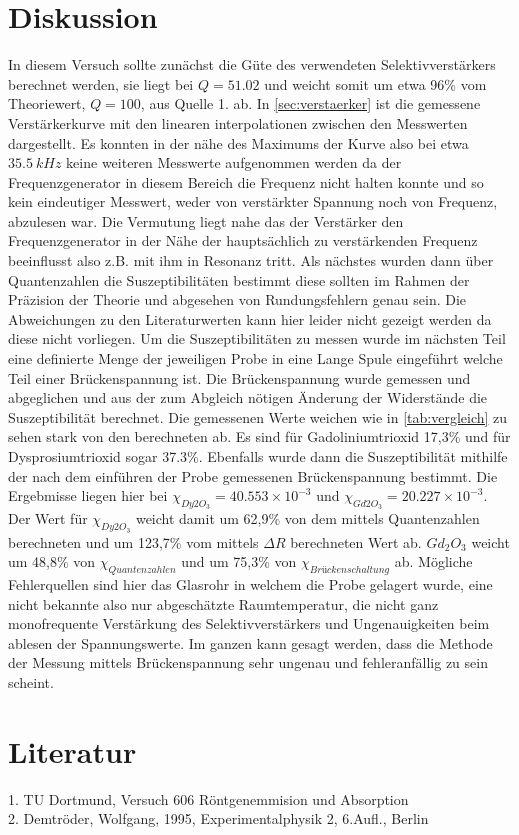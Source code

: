 \section{Diskussion} %
\label{sec:Diskussion}
In diesem Versuch sollte zunächst die Güte des verwendeten Selektivverstärkers berechnet werden,
sie liegt bei $Q=51.02$ und weicht somit um etwa 96\% vom Theoriewert, $Q=100$, aus Quelle 1. ab. In
\autoref{sec:verstaerker} ist die gemessene Verstärkerkurve mit den linearen interpolationen 
zwischen den Messwerten dargestellt. Es konnten
in der nähe des Maximums der Kurve also bei etwa $\SI[]{35.5}[]{kHz}$ keine weiteren Messwerte aufgenommen werden
da der Frequenzgenerator in diesem Bereich die Frequenz nicht halten konnte und so kein eindeutiger 
Messwert, weder von verstärkter Spannung noch von Frequenz, abzulesen war. Die Vermutung liegt nahe das
der Verstärker den Frequenzgenerator in der Nähe der hauptsächlich zu verstärkenden Frequenz beeinflusst
also z.B. mit ihm in Resonanz tritt. Als nächstes wurden dann über Quantenzahlen die Suszeptibilitäten 
bestimmt diese sollten im Rahmen der Präzision der Theorie und abgesehen von Rundungsfehlern genau sein. Die
Abweichungen zu den Literaturwerten kann hier leider nicht gezeigt werden da diese nicht vorliegen.
Um die Suszeptibilitäten zu messen wurde im nächsten Teil eine definierte Menge 
der jeweiligen Probe in eine Lange Spule eingeführt welche Teil einer Brückenspannung
ist. Die Brückenspannung wurde gemessen und abgeglichen und aus der zum Abgleich nötigen Änderung der Widerstände
die Suszeptibilität berechnet. Die gemessenen Werte weichen wie in \autoref{tab:vergleich} zu sehen stark von den berechneten ab.
Es sind für  Gadoliniumtrioxid 17,3\% und für Dysprosiumtrioxid sogar 37.3\%. Ebenfalls wurde dann die 
Suszeptibilität mithilfe der nach dem einführen der Probe gemessenen Brückenspannung bestimmt.
Die Ergebmisse liegen hier bei $\chi_{Dy2 O_3}=40.553 \times 10^{-3}$ und 
$\chi_{Gd2 O_3}=20.227 \times 10^{-3}$. Der Wert für $\chi_{Dy2 O_3}$ weicht damit um 62,9\% von dem mittels Quantenzahlen
berechneten und um 123,7\% vom mittels $\Delta R$ berechneten Wert ab. $Gd_2 O_3$ weicht um 48,8\% von $\chi_{Quantenzahlen}$
 und um 75,3\% von $\chi_{Brückenschaltung}$ ab. 
Mögliche Fehlerquellen sind hier das Glasrohr in welchem die Probe gelagert wurde,
eine nicht bekannte also nur abgeschätzte Raumtemperatur, die nicht ganz monofrequente Verstärkung des Selektivverstärkers
und Ungenauigkeiten beim ablesen der Spannungswerte.
Im ganzen kann gesagt werden, dass die Methode der Messung mittels Brückenspannung sehr ungenau und fehleranfällig zu sein scheint.
\section{Literatur}
\label{Literatur}
1. TU Dortmund, Versuch 606 Röntgenemmision und Absorption\\
2. Demtröder, Wolfgang, 1995, Experimentalphysik 2, 6.Aufl., Berlin\\
